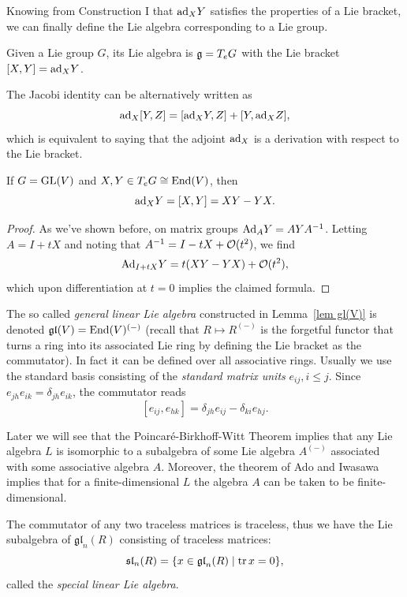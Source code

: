Knowing from Construction I that $\mathrm{ad}_X Y$ satisfies the properties of a Lie bracket, we can finally define the Lie algebra corresponding to a Lie group.

\begin{defn}
    Given a Lie group $G$, its Lie algebra is $\mathfrak{g}=T_e  G$ with the Lie bracket $[X,Y]=\mathrm{ad}_X Y$. 
    
    The Jacobi identity can be alternatively written as
    \[\mathrm{ad}_X[Y,Z]=[\mathrm{ad}_X Y,Z]+[Y,\mathrm{ad}_X Z],\]
    which is equivalent to saying that the adjoint $\mathrm{ad}_X$ is a derivation with respect to the Lie bracket.
\end{defn}

\begin{lem}\label{lem gl(V)}
    If $G=\operatorname{GL}(V)$ and $X,Y\in T_e G\cong \operatorname{End}(V)$, then 
    \[\mathrm{ad}_X Y=[X,Y]=XY-YX.\]
\end{lem}
\begin{proof}
    As we've shown before, on matrix groups $\mathrm{Ad}_A Y=AYA^{-1}$. Letting $A=I+tX$ and noting that $A^{-1}=I-tX+\mathcal{O}(t^2)$, we find
    \[\mathrm{Ad}_{I+tX} Y=t(XY-YX)+\mathcal{O}(t^2),\]
    which upon differentiation at $t=0$ implies the claimed formula.
\end{proof}


\begin{example}[$\mathfrak{gl}_n(R)$]
    The so called \emph{general linear Lie algebra} constructed in Lemma~\ref{lem gl(V)} is denoted $\mathfrak{gl}(V)=\operatorname{End}(V)^{(-)}$ (recall that $R\mapsto R^{(-)}$ is the forgetful functor that turns a ring into its associated Lie ring by defining the Lie bracket as the commutator). In fact it can be defined over all associative rings. Usually we use the standard basis consisting of the \emph{standard matrix units} $e_{ij},i\leq j$. Since $e_{jh}e_{ik}=\delta_{jh}e_{ik}$, the commutator reads
    \[[e_{ij},e_{hk}]=\delta_{jh}e_{ij}-\delta_{ki}e_{hj}.\]

    Later we will see that the Poincar\'e-Birkhoff-Witt Theorem implies that any Lie algebra $L$ is isomorphic to a subalgebra of some Lie algebra $A^{(-)}$ associated with some associative algebra $A$. Moreover, the theorem of Ado and Iwasawa implies that for a finite-dimensional $L$ the algebra $A$ can be taken to be finite-dimensional.
\end{example}

\begin{example}[$\mathfrak{sl}_n(R)$]
    The commutator of any two traceless matrices is traceless, thus we have the Lie subalgebra of $\mathfrak{gl}_n(R)$ consisting of traceless matrices:
    \[\mathfrak{sl}_n(R)=\{x\in \mathfrak{gl}_n(R)\mid \operatorname{tr} x=0\},\]
    called the \emph{special linear Lie algebra}.
\end{example}

